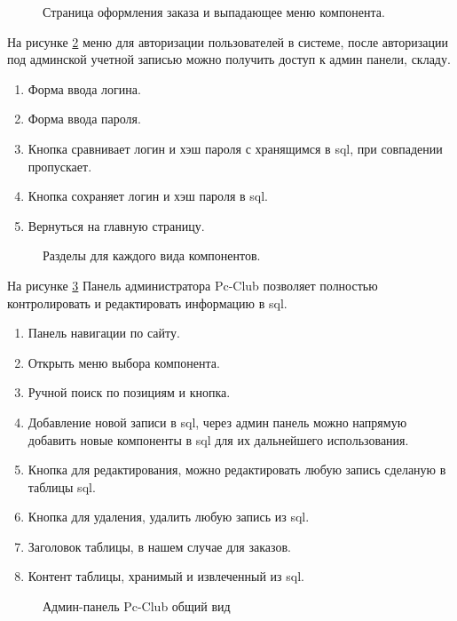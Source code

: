 \begin{figure}[H]
\caption{Страница оформления заказа и выпадающее меню компонента.}
\label{main:image}
\end{figure}

На рисунке \ref{login:image} меню для авторизации пользователей в системе, после авторизации под админской учетной записью можно получить доступ к админ панели, складу.
\begin{enumerate}
	\item Форма ввода логина.
	\item Форма ввода пароля.
	\item Кнопка сравнивает логин и хэш пароля с хранящимся в sql, при совпадении пропускает.
	\item Кнопка сохраняет логин и хэш пароля в sql.
	\item Вернуться на главную страницу.
\end{enumerate}
\begin{figure}[ht]
	\caption{Разделы для каждого вида компонентов.}
	\label{login:image}
\end{figure}

На рисунке \ref{adminall:image} Панель администратора Pc-Club позволяет полностью контролировать и редактировать информацию в sql.

\begin{enumerate}
	\item Панель навигации по сайту.
	\item Открыть меню выбора компонента.
	\item Ручной поиск по позициям и кнопка.
	\item Добавление новой записи в sql, через админ панель можно напрямую добавить новые компоненты в sql для их дальнейшего использования.
	\item Кнопка для редактирования, можно редактировать любую запись сделаную в таблицы sql.
	\item Кнопка для удаления, удалить любую запись из sql.
	\item Заголовок таблицы, в нашем случае для заказов.
	\item Контент таблицы, хранимый и извлеченный из sql.
\end{enumerate}

\begin{figure}[ht]
\caption{Админ-панель Pc-Club общий вид}
\label{adminall:image}
\end{figure}

